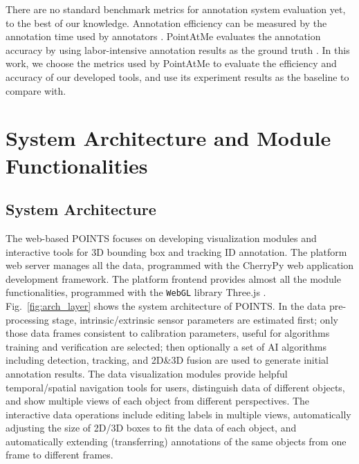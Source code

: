 \documentclass[letterpaper, 10 pt, conference]{ieeeconf}  %
\begin{document}
There are no standard benchmark metrics for annotation system evaluation yet, to the best of our knowledge.
Annotation efficiency can be measured by the annotation time used by annotators \cite{monica2017multi,pointatme,Zimmer20193DBA}. 
PointAtMe evaluates the annotation accuracy by using labor-intensive annotation results as the ground truth \cite{pointatme}. 
In this work, we choose the metrics used by PointAtMe \cite{pointatme} to evaluate the efficiency and accuracy of our developed tools, 
and use its experiment results as the baseline to compare with.


\section{System Architecture and Module Functionalities}
\label{sec:systemarch}

\subsection{System Architecture}

The web-based POINTS focuses on developing visualization modules and interactive tools for 3D bounding box and tracking ID annotation.
The platform web server manages all the data, programmed with the CherryPy \cite{cherrypy} web application development framework.
The platform frontend provides almost all the module functionalities, programmed with the \texttt{WebGL} library Three.js \cite{threejs}.
Fig.~\ref{fig:arch_layer} shows the system architecture of POINTS.
In the data pre-processing stage, intrinsic/extrinsic sensor parameters are estimated first; only those data frames consistent to calibration parameters, useful for algorithms training and verification are selected; then optionally a set of AI algorithms including detection, tracking, and 2D\&3D fusion are used to generate initial annotation results. The data visualization modules provide helpful temporal/spatial navigation tools for users, distinguish data of different objects, and show multiple views of each object from different perspectives. The interactive data operations include editing labels in multiple views, automatically adjusting the size of 2D/3D boxes to fit the data of each object, and automatically extending (transferring) annotations of the same objects from one frame to different frames.
\end{document}
